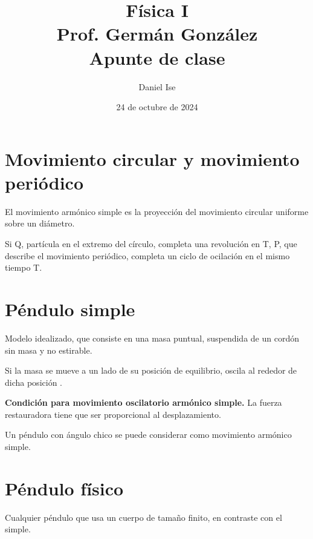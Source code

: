 \documentclass[12pt]{article}
\title{Física I\\Prof. Germán González\\Apunte de clase}
\author{Daniel Ise}
\date{24 de octubre de 2024}
\begin{document}
\maketitle

\tableofcontents

\section{Movimiento circular y movimiento periódico}

El movimiento armónico simple es la proyección del movimiento circular uniforme
sobre un diámetro.

Si Q, partícula en el extremo del círculo,
completa una revolución en T,
P, que describe el movimiento periódico,
completa un ciclo de ocilación en el mismo tiempo T.

\section{Péndulo simple}

Modelo idealizado,
que consiste en una masa puntual,
suspendida de un cordón sin masa y no estirable.

Si la masa se mueve a un lado de su posición de equilibrio,
oscila al rededor de dicha posición .

\textbf{Condición para movimiento oscilatorio armónico simple.}
La fuerza restauradora tiene que ser proporcional al desplazamiento.

Un péndulo con ángulo chico se puede considerar como movimiento 
armónico simple.

\section{Péndulo físico}

Cualquier péndulo que usa un cuerpo de tamaño finito,
en contraste con el simple.
\end{document}
